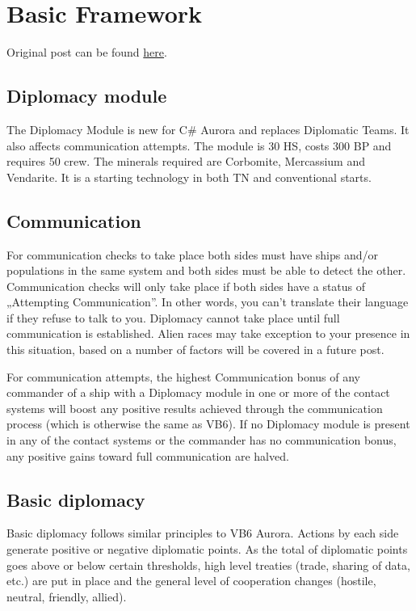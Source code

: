\documentclass[../Aurora C# unofficial manual.tex]{subfiles}
\begin{document}
	\section{Basic Framework}\label{1_basic_framework}
	Original post can be found
	\href{http://aurora2.pentarch.org/index.php?topic=8495.msg118258#msg118258}{here}.
	
	\subsection{Diplomacy module}
	The Diplomacy Module is new for C\# Aurora and replaces Diplomatic Teams. It also affects communication attempts. The module is 30 HS, costs 300 BP and requires 50 crew. The minerals required are Corbomite, Mercassium and Vendarite. It is a starting technology in both TN and conventional starts.
	
	\subsection{Communication}
	For communication checks to take place both sides must have ships and/or populations in the same system and both sides must be able to detect the other. Communication checks will only take place if both sides have a status of „Attempting Communication”. In other words, you can't translate their language if they refuse to talk to you. Diplomacy cannot take place until full communication is established. Alien races may take exception to your presence in this situation, based on a number of factors will be covered in a future post.
	
	For communication attempts, the highest Communication bonus of any commander of a ship with a Diplomacy module in one or more of the contact systems will boost any positive results achieved through the communication process (which is otherwise the same as VB6). If no Diplomacy module is present in any of the contact systems or the commander has no communication bonus, any positive gains toward full communication are halved.
	
	\subsection{Basic diplomacy}
	Basic diplomacy follows similar principles to VB6 Aurora. Actions by each side generate positive or negative diplomatic points. As the total of diplomatic points goes above or below certain thresholds, high level treaties (trade, sharing of data, etc.) are put in place and the general level of cooperation changes (hostile, neutral, friendly, allied).
	
\end{document}

